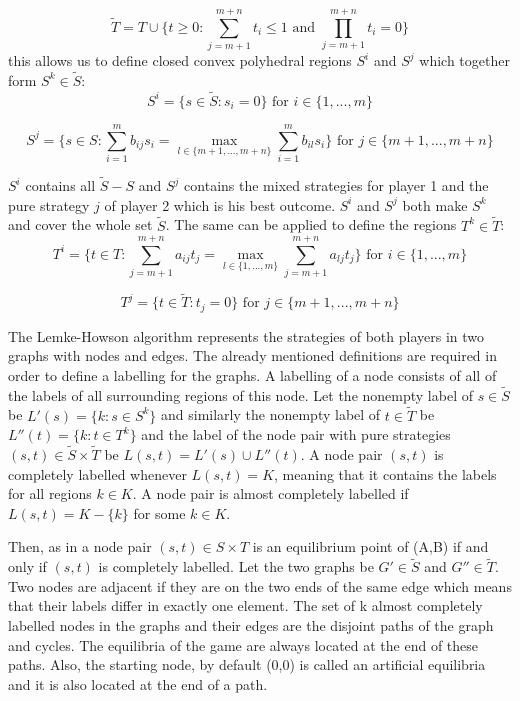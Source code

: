 \begin{equation}
\tilde{T} = T \cup \{t \geq 0: \sum_{j=m+1}^{m+n} t_i \leq 1 \text{ and } \prod_{j=m+1}^{m+n} t_i = 0 \}
\end{equation}
this allows us to define closed convex polyhedral regions $S^i$ and $S^j$ which together form $S^k \in \tilde{S}$:
\begin{equation}
S^i = \{ s \in \tilde{S}: s_i = 0 \} \text{ for } i \in \{1,...,m\}
\end{equation}


\begin{equation}
S^j = \Big\{ s \in S: \sum_{i=1}^{m} b_{ij} s_i = \max_{l \in \{m+1,...,m+n\}} \sum_{i=1}^{m} b_{il} s_i \Big\} \text{ for } j \in \{m+1,...,m+n\}
\end{equation}


$S^i$ contains all $\tilde{S}-S$ and $S^j$ contains the mixed strategies for player 1 and the pure strategy $j$ of player 2 which is his best outcome. $S^i$ and $S^j$ both make $S^k$ and cover the whole set $\tilde{S}$. The same can be applied to define the regions $T^k \in \tilde{T}$:
\begin{equation} 
T^i = \Big\{ t \in T: \sum_{j=m+1}^{m+n} a_{ij} t_j = \max_{l \in \{1,...,m\}} \sum_{j=m+1}^{m+n} a_{lj} t_j \Big\} \text{ for } i \in \{1,...,m\} 
\end{equation}

\begin{equation}
T^j = \{ t \in \tilde{T}: t_j = 0 \} \text{ for } j \in \{m+1,...,m+n\} 
\end{equation}


The Lemke-Howson algorithm represents the strategies of both players in two graphs with nodes and edges. The already mentioned definitions are required in order to define a labelling for the graphs. A labelling of a node consists of all of the labels of all surrounding regions of this node. Let the nonempty label of $s \in \tilde{S}$ be $L'(s) = \{ k: s \in S^k \}$ and similarly the nonempty label of $t \in \tilde{T}$ be $L''(t) = \{ k: t \in T^k \}$ and the label of the node pair with pure strategies $(s,t) \in \tilde{S} \times \tilde{T}$ be $L(s,t) = L'(s) \cup L''(t)$. A node pair $(s,t)$ is completely labelled whenever $L(s,t) = K$, meaning that it contains the labels for all regions $k \in K$. A node pair is almost completely labelled if $L(s,t) = K - \{k\}$ for some $k \in K$. 

Then, as in \citet{shapley1974note} a node pair $(s,t) \in S \times T$ is an equilibrium point of (A,B) if and only if $(s,t)$ is completely labelled. Let the two graphs be $G' \in \tilde{S}$ and $G'' \in \tilde{T}$. Two nodes are adjacent if they are on the two ends of the same edge which means that their labels differ in exactly one element. The set of k almost completely labelled nodes in the graphs and their edges are the disjoint paths of the graph and cycles. The equilibria of the game are always located at the end of these paths. Also, the starting node, by default (0,0) is called an artificial equilibria and it is also located at the end of a path.

